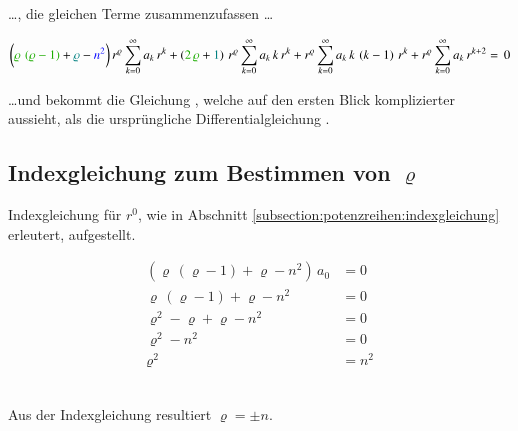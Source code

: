 \begin{normalsize}
	\dots , die gleichen Terme zusammenzufassen \dots
\end{normalsize}
\begin{align}
	\biggl(
	\textcolor{mygreen}{\varrho \, \left( \varrho - 1 \right)}
	+ 
	\textcolor{teal}{\varrho}
	-
	\textcolor{blue}{n^2}
	\biggr)
	\, r^{\varrho}
	\sum_{k=0}^{\infty} a_k \, r^k
	+ 
	\left(	
	\textcolor{mygreen}{2 \, \varrho}
	+
	\textcolor{teal}{1}
	\right)
	\, r^{\varrho}
	\sum_{k=0}^{\infty} a_k \, k \, r^k
	+
	r^{\varrho}
	\sum_{k=0}^{\infty} a_k \, k \, \left( k - 1 \right) \, r^k
	+ 
	r^{\varrho}
	\sum_{k=0}^{\infty} a_k \, r^{k + 2}
	= \, 0
	\label{eq:bessel:potenzreihe:dgl:vereinfacht}
\end{align}
\begin{normalsize}
	\dots und bekommt die Gleichung ,
	welche auf den ersten Blick komplizierter aussieht,
	als die urspr\"ungliche Differentialgleichung .
\end{normalsize}
\subsection[Indexgleichung f\"ur $\varrho$]{Indexgleichung zum Bestimmen von $\varrho$}
\begin{normalsize}
	Indexgleichung f\"ur $r^0$,
	wie in Abschnitt \ref{subsection:potenzreihen:indexgleichung} erleutert,
	aufgestellt.
\end{normalsize}
\begin{align*}	\left( \varrho \, \left( \varrho -1 \right) + \varrho - n^2 \right) \, a_0 &= 0 \\
	\varrho \, \left( \varrho -1 \right) + \varrho - n^2 &= 0 \\
	\varrho ^2 - \varrho + \varrho -n^2 &= 0  \\
	\varrho ^2 - n^2 &= 0 \\
	\varrho ^2 &= n^2
\end{align*}
\\
\begin{normalsize}
	Aus der Indexgleichung resultiert $\varrho = \pm n$.
	
\end{normalsize}

